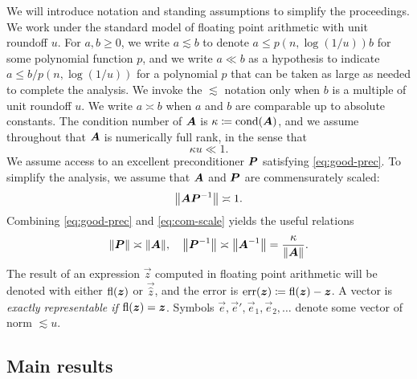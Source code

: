 \documentclass[onefignum,onetabnum,pagebackref,dvipsnames]{siamart220329}
\begin{document}
We will introduce notation and standing assumptions to simplify the proceedings.
We work under the standard model of floating point arithmetic \cite[sec.~2.2]{Hig02} with unit roundoff $u$.
For $a,b\ge 0$, we write $a\lesssim b$ to denote $a \le p(n,\log(1/u)) b$ for some polynomial function $p$,
and we write $a \ll b$ as a hypothesis to indicate $a \le b/p(n,\log(1/u))$ for a polynomial $p$ that can be taken as large as needed to complete the analysis.
We invoke the $\lesssim$ notation only when $b$ is a multiple of unit roundoff $u$.
We write $a \asymp b$ when $a$ and $b$ are comparable up to absolute constants.
The condition number of $\boldsymbol{A}$ is $\kappa \coloneqq \operatorname{cond}(\boldsymbol{A})$, and we assume throughout that $\boldsymbol{A}$ is numerically full rank, in the sense that
%
\begin{equation} \label{eq:numerically-full-rank}
    \kappa u \ll 1.
\end{equation}
%
We assume access to an excellent preconditioner $\boldsymbol{P}$ satisfying \cref{eq:good-prec}. 
To simplify the analysis, we assume that $\boldsymbol{A}$ and $\boldsymbol{P}$ are commensurately scaled:
%
\begin{equation} \label{eq:com-scale}
    \norm{\mat{A}\mat{P}^{-1}} \asymp 1.
\end{equation}
%
Combining \cref{eq:good-prec} and \cref{eq:com-scale} yields the useful relations
%
\begin{equation} \label{eq:AP-norms}
    \norm{\mat{P}} \asymp \norm{\mat{A}}, \quad \norm{\mat{P}^{-1}} \asymp \norm{\mat{A}^{-1}} = \frac{\kappa}{\norm{\mat{A}}}.
\end{equation}
%
The result of an expression $\vec{z}$ computed in floating point arithmetic will be denoted with either $\operatorname{fl}(\boldsymbol{z})$ or $\vec{\hat{z}}$, and the error is $\operatorname{err}(\boldsymbol{z}) \coloneqq \operatorname{fl}(\boldsymbol{z}) - \boldsymbol{z}$.
A vector is \emph{exactly representable if} $\operatorname{fl}(\boldsymbol{z}) = \boldsymbol{z}$.
Symbols $\vec{e},\vec{e}',\vec{e}_1,\vec{e}_2,\ldots$ denote some vector of norm $\lesssim u$.

\subsection{Main results}
\end{document}

